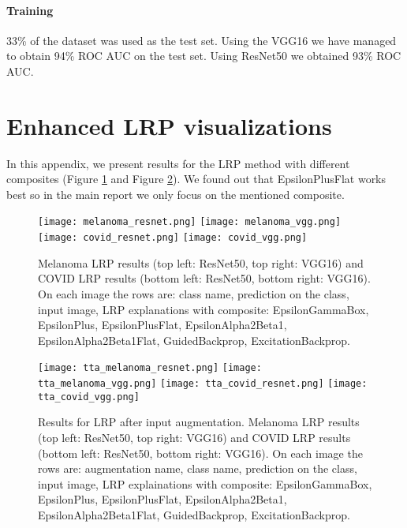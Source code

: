 \documentclass[twoside,11pt]{article}
\begin{document}
\paragraph{Training}
33\% of the dataset was used as the test set.
Using the VGG16 we have managed to obtain 94\% ROC AUC on the test set.
Using ResNet50 we obtained 93\% ROC AUC.

\section{Enhanced LRP visualizations} \label{appendix:lrp}
In this appendix, we present results for the LRP method with different composites (Figure \ref{fig:lrp_long} and Figure \ref{fig:lrp_tta_long}).
We found out that EpsilonPlusFlat works best so in the main report we only focus on the mentioned composite.

\begin{figure}[t]
    \centering
    \texttt{[image: melanoma\_resnet.png]}
    \texttt{[image: melanoma\_vgg.png]}
    \texttt{[image: covid\_resnet.png]}
    \texttt{[image: covid\_vgg.png]}
    \caption{
    Melanoma LRP results (top left: ResNet50, top right: VGG16) and COVID LRP results (bottom left: ResNet50, bottom right: VGG16).
    On each image the rows are: class name, prediction on the class, input image, LRP explanations with composite: EpsilonGammaBox, EpsilonPlus, EpsilonPlusFlat, EpsilonAlpha2Beta1, EpsilonAlpha2Beta1Flat, GuidedBackprop, ExcitationBackprop.
    }
    \label{fig:lrp_long}
\end{figure}
\begin{figure}[t]
    \centering
    \texttt{[image: tta\_melanoma\_resnet.png]}
    \texttt{[image: tta\_melanoma\_vgg.png]}
    \texttt{[image: tta\_covid\_resnet.png]}
    \texttt{[image: tta\_covid\_vgg.png]}
    \caption{
    Results for LRP after input augmentation.
    Melanoma LRP results (top left: ResNet50, top right: VGG16) and COVID LRP results (bottom left: ResNet50, bottom right: VGG16).
    On each image the rows are: augmentation name, class name, prediction on the class, input image, LRP explainations with composite: EpsilonGammaBox, EpsilonPlus, EpsilonPlusFlat, EpsilonAlpha2Beta1, EpsilonAlpha2Beta1Flat, GuidedBackprop, ExcitationBackprop.
    }
    \label{fig:lrp_tta_long}
\end{figure}
\end{document}

